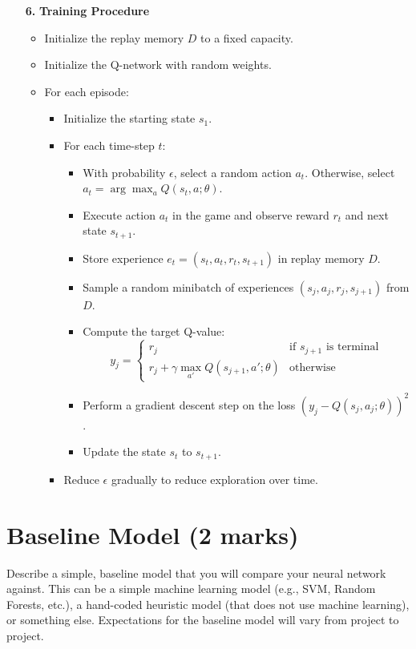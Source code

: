 \documentclass{article} %
\begin{document}
\begin{itemize}
    \item[\textbf{6.}] \textbf{Training Procedure}
    \begin{itemize}
        \item Initialize the replay memory \( D \) to a fixed capacity.
        \item Initialize the Q-network with random weights.
        \item For each episode:
        \begin{itemize}
            \item Initialize the starting state \( s_1 \).
            \item For each time-step \( t \):
            \begin{itemize}
                \item With probability \( \epsilon \), select a random action \( a_t \). Otherwise, select \( a_t = \arg\max_a Q(s_t, a; \theta) \).
                \item Execute action \( a_t \) in the game and observe reward \( r_t \) and next state \( s_{t+1} \).
                \item Store experience \( e_t = (s_t, a_t, r_t, s_{t+1}) \) in replay memory \( D \).
                \item Sample a random minibatch of experiences \( (s_j, a_j, r_j, s_{j+1}) \) from \( D \).
                \item Compute the target Q-value:
                \[
                y_j = \begin{cases}
                r_j & \text{if } s_{j+1} \text{ is terminal} \\
                r_j + \gamma \max_{a'} Q(s_{j+1}, a'; \theta) & \text{otherwise}
                \end{cases}
                \]
                \item Perform a gradient descent step on the loss \( (y_j - Q(s_j, a_j; \theta))^2 \).
                \item Update the state \( s_t \) to \( s_{t+1} \).
            \end{itemize}
            \item Reduce \( \epsilon \) gradually to reduce exploration over time.
        \end{itemize}
    \end{itemize}
\end{itemize}



\section{Baseline Model (2 marks)}
Describe a simple, baseline model that you will compare your neural
network against. This can be a simple machine learning model (e.g., SVM, Random Forests, etc.), a hand-coded heuristic model (that does not use machine learning), or something else. Expectations for the baseline model will vary from project to project.
\end{document}
